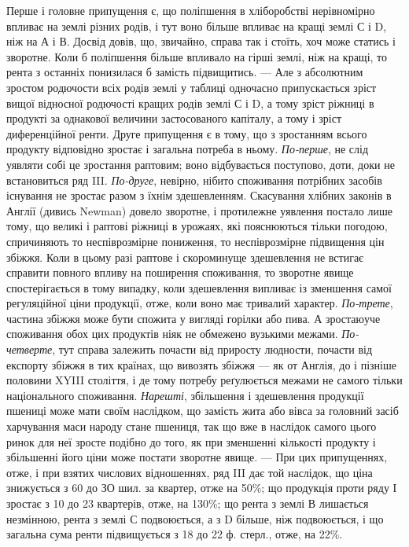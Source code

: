 Перше і головне припущення є, що поліпшення в хліборобстві нерівномірно
впливає на землі різних родів, і тут воно більше впливає на кращі землі
С і D, ніж на А і В. Досвід довів, що, звичайно, справа так і стоїть, хоч може
статись і зворотне. Коли б поліпшення більше впливало на гірші землі, ніж на
кращі, то рента з останніх понизилася б замість підвищитись. — Але з абсолютним
зростом родючости всіх родів землі у таблиці одночасно припускається зріст
вищої відносної родючості кращих родів землі С і D, а тому зріст ріжниці в продукті за однакової
величини застосованого капіталу, а тому і зріст диференційної ренти.
Друге припущення є в тому, що з зростанням всього продукту відповідно зростає і загальна потреба в
ньому. \emph{По-перше}, не слід уявляти собі це зростання раптовим; воно відбувається поступово, доти, доки
не встановиться ряд III. \emph{По-друге}, невірно, нібито споживання потрібних засобів існування не зростає разом з їхнім
здешевленням. Скасування хлібних законів в Англії (дивись Newman) довело зворотне, і протилежне
уявлення постало лише тому, що великі і раптові ріжниці в урожаях, які пояснюються тільки погодою,
спричиняють то неспіврозмірне пониження, то неспіврозмірне підвищення цін збіжжя.
Коли в цьому разі раптове і скороминуще здешевлення не встигає справити повного впливу на поширення
споживання, то зворотне явище спостерігається в тому випадку, коли здешевлення випливає із зменшення
самої регуляційної ціни продукції, отже, коли воно має тривалий характер. \emph{По-трете}, частина збіжжя
може бути спожита у вигляді горілки або пива. А зростаюуче споживання обох цих продуктів ніяк не
обмежено вузькими межами. \emph{По-четверте}, тут справа залежить почасти від приросту людности, почасти
від експорту збіжжя в тих країнах, що вивозять збіжжя — як от Англія, до і
пізніше половини XYIII століття, і де тому потребу реґулюється межами не самого
тільки національного споживання. \emph{Нарешті}, збільшення і здешевлення
продукції пшениці може мати своїм наслідком, що замість жита або вівса за
головний засіб харчування маси народу стане пшениця, так що вже в наслідок
самого цього ринок для неї зросте подібно до того, як при зменшенні кількості
продукту і збільшенні його ціни може постати зворотне явище. — При цих припущеннях, отже, і при
взятих числових відношеннях, ряд III дає той наслідок,
що ціна знижується з 60 до ЗО шил. за квартер, отже на 50\%; що продукція проти ряду І зростає з 10
до 23 квартерів, отже, на 130\%; що рента з землі В лишається незмінною, рента з землі С
подвоюється, а з D більше, ніж подвоюється, і що загальна сума ренти підвищується з 18 до 22 ф.
стерл., отже, на 22\%.

